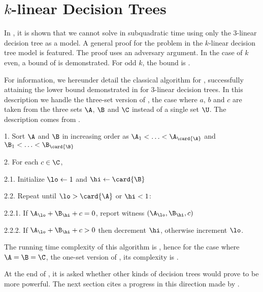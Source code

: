 \section{$k$-linear Decision Trees}

In \citet*{erickson:1999}, it is shown that we cannot solve \threeSUM in
subquadratic time using only the $3$-linear decision tree as a model. A
general proof for the \kLDT problem in the $k$-linear decision tree model
is featured. The proof uses an adversary argument. In the case of $k$
even, a bound of  is demonstrated. For odd $k$, the
bound is .

For information, we hereunder detail the classical  algorithm for
\threeSUM, successfully attaining the lower bound demonstrated in
\cite{erickson:1999} for $3$-linear decision trees. In this description we
handle the three-set version of \threeSUM, \ie the case where $a$, $b$ and $c$
are taken from the three sets $\A$, $\B$ and $\C$ instead of a single set $\U$.
The description comes from \citet*{gronlund:2014}.


\begin{algorithm}
\item[1.] Sort $\A$ and $\B$ in increasing order as $\A_1 < \ldots <
\A_{\card{\A}}$ and $\B_1 < \ldots < \B_{\card{\B}}$
\item[2.] For each $c \in \C$,
\item[2.1.] Initialize $\lo \gets 1$ and $\hi \gets \card{\B}$
\item[2.2.] Repeat until $\lo > \card{\A}$ or $\hi < 1$:
\item[2.2.1.] If $\A_{\lo} + \B_{\hi} + c = 0$, report witness $(\A_{\lo},
\B_{\hi}, c)$
\item[2.2.2.] If $\A_{\lo} + \B_{\hi} + c > 0$ then decrement $\hi$, otherwise
increment $\lo$.
\end{algorithm}


The running time complexity of this algorithm is
\BigO{\card{\C}(\card{\A}+\card{\B})}, hence for the case where
$\A = \B = \C$, \ie the one-set version of \threeSUM, its complexity is
.

At the end of \cite{erickson:1999}, it is asked whether other kinds of
decision trees would prove to be more powerful. The next section cites a
progress in this direction made by \citet*{ailon:2005}.
